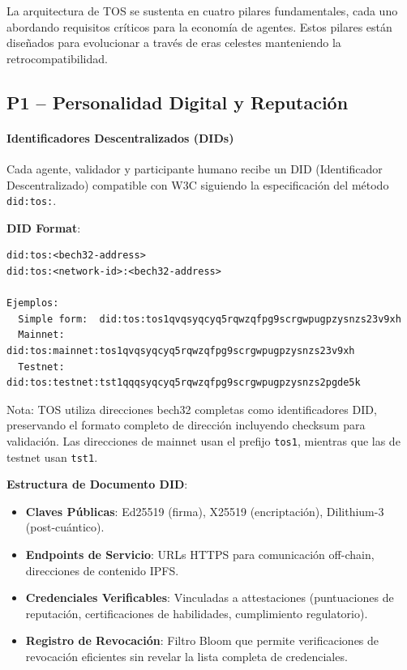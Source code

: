 \documentclass[11pt]{article}
\begin{document}
La arquitectura de TOS se sustenta en cuatro pilares fundamentales, cada uno abordando requisitos críticos para la economía de agentes. Estos pilares están diseñados para evolucionar a través de eras celestes manteniendo la retrocompatibilidad.

\subsection{P1 -- Personalidad Digital y Reputación}
\label{sec:pillar-identity}

\paragraph{Identificadores Descentralizados (DIDs)}
Cada agente, validador y participante humano recibe un DID (Identificador Descentralizado) compatible con W3C siguiendo la especificación del método \texttt{did:tos:}.

\textbf{DID Format}:
\begin{verbatim}
did:tos:<bech32-address>
did:tos:<network-id>:<bech32-address>

Ejemplos:
  Simple form:  did:tos:tos1qvqsyqcyq5rqwzqfpg9scrgwpugpzysnzs23v9xh
  Mainnet:      did:tos:mainnet:tos1qvqsyqcyq5rqwzqfpg9scrgwpugpzysnzs23v9xh
  Testnet:      did:tos:testnet:tst1qqqsyqcyq5rqwzqfpg9scrgwpugpzysnzs2pgde5k
\end{verbatim}
Nota: TOS utiliza direcciones bech32 completas como identificadores DID, preservando el formato completo de dirección incluyendo checksum para validación. Las direcciones de mainnet usan el prefijo \texttt{tos1}, mientras que las de testnet usan \texttt{tst1}.

\textbf{Estructura de Documento DID}:
\begin{itemize}[noitemsep]
  \item \textbf{Claves Públicas}: Ed25519 (firma), X25519 (encriptación), Dilithium-3 (post-cuántico).
  \item \textbf{Endpoints de Servicio}: URLs HTTPS para comunicación off-chain, direcciones de contenido IPFS.
  \item \textbf{Credenciales Verificables}: Vinculadas a attestaciones (puntuaciones de reputación, certificaciones de habilidades, cumplimiento regulatorio).
  \item \textbf{Registro de Revocación}: Filtro Bloom que permite verificaciones de revocación eficientes sin revelar la lista completa de credenciales.
\end{itemize}
\end{document}
